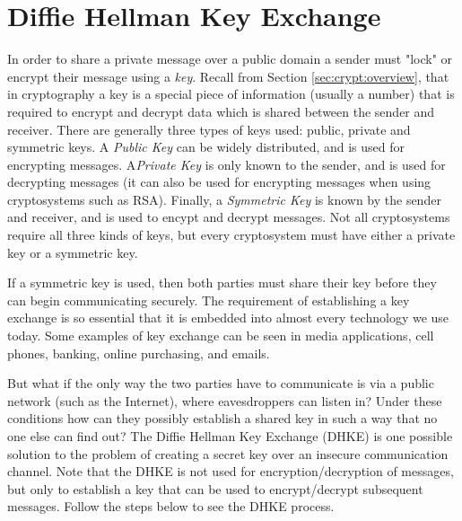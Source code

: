 \section{Diffie Hellman Key Exchange}\label{sec:DHKE:1}

In order to share a private message over a public domain a sender must  "lock" or encrypt their message using a \emph{key}.  Recall from Section \ref{sec:crypt:overview}, that in cryptography a  key is a special piece of information (usually a number)  that is required to encrypt and decrypt data which is shared between the sender and receiver. There are generally three types of keys used: public, private and symmetric keys. A \emph{Public Key} can be widely distributed, and is used for encrypting messages.  A\emph{Private Key} is only known to the sender, and is used for decrypting messages (it can also be used for encrypting messages when using cryptosystems such as RSA).  Finally, a \emph{Symmetric Key} is known by the sender and receiver, and is used to encypt and decrypt messages.  Not all cryptosystems require all three kinds of keys, but every cryptosystem must have either a private key or a symmetric key.

  If a symmetric key is used, then both parties must share their key before they can begin communicating securely. The requirement of establishing a key exchange is so essential that it is embedded into almost every technology we use today.  Some examples of key exchange can be seen in media applications, cell phones, banking, online purchasing, and emails.  

 But what if the only way the two parties have to communicate is via a public network (such as the Internet), where eavesdroppers can listen in?  Under these conditions how can they possibly establish a shared key in such a way that no one else can find out?  The Diffie Hellman Key Exchange (DHKE) is one possible solution to the problem of creating a secret key over an insecure communication channel.  Note that the DHKE is not used for encryption/decryption of messages, but only to establish a key that can be used to encrypt/decrypt subsequent messages.  Follow the steps below to see the DHKE process.  

